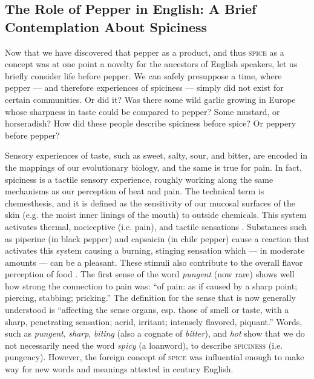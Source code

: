 
\subsection{The Role of Pepper in English: A Brief Contemplation About Spiciness}

Now that we have discovered that pepper as a product, and thus \textsc{spice} as a concept was at one point a novelty for the ancestors of English speakers, let us briefly consider life before pepper. We can safely presuppose a time, where pepper --- and therefore experiences of spiciness --- simply did not exist for certain communities. Or did it? Was there some wild garlic growing in Europe whose sharpness in taste could be compared to pepper? Some mustard, or horseradish? How did these people describe spiciness before spice? Or peppery before pepper? 

Sensory experiences of taste, such as sweet, salty, sour, and bitter, are encoded in the mappings of our evolutionary biology, and the same is true for pain. In fact, spiciness is a tactile sensory experience, roughly working along the same mechanisms as our perception of heat and pain. The technical term is chemesthesis, and it is defined as the sensitivity of our mucosal surfaces of the skin (e.g. the moist inner linings of the mouth) to outside chemicals. This system activates thermal, nociceptive (i.e. pain), and tactile sensations \autocite{simons_oral_2008}. Substances such as piperine (in black pepper) and capsaicin (in chile pepper) cause a reaction that activates this system causing a burning, stinging sensation which --- in moderate amounts --- can be a pleasant. These stimuli also contribute to the overall flavor perception of food \autocite{tewksbury_evolutionary_2008}. The first sense of the word \textit{pungent} (now rare) shows well how strong the connection to pain was: ``of pain: as if caused by a sharp point; piercing, stabbing; pricking.'' The definition for the sense that is now generally understood is ``affecting the sense organs, esp. those of smell or taste, with a sharp, penetrating sensation; acrid, irritant; intensely flavored, piquant.'' Words, such as \textit{pungent}, \textit{sharp}, \textit{biting} (also a cognate of \textit{bitter}), and \textit{hot} show that we do not necessarily need the word \textit{spicy} (a loanword), to describe \textsc{spiciness} (i.e. pungency). However, the foreign concept of \textsc{spice} was influential enough to make way for new words and meanings attested in  century English. 

